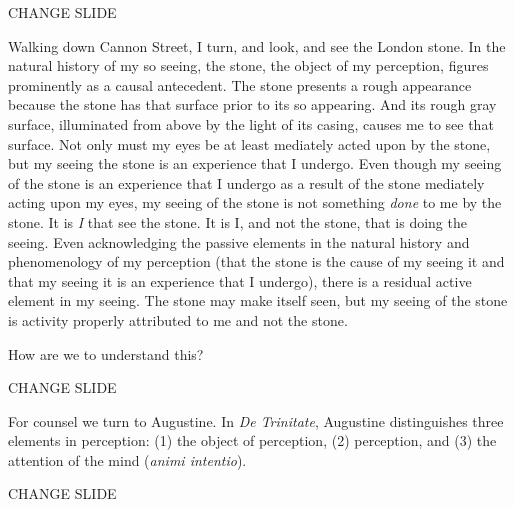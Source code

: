 \documentclass[12pt]{article}
\title{\mytitle}
\author{\myauthor}
\date{} %
\begin{document}
\maketitle

\setlength{\parindent}{1em}


CHANGE SLIDE

Walking down Cannon Street, I turn, and look, and see the London stone. In the natural history of my so seeing, the stone, the object of my perception, figures prominently as a causal antecedent. The stone presents a rough appearance because the stone has that surface prior to its so appearing. And its rough gray surface, illuminated from above by the light of its casing, causes me to see that surface. Not only must my eyes be at least mediately acted upon by the stone, but my seeing the stone is an experience that I undergo. Even though my seeing of the stone is an experience that I undergo as a result of the stone mediately acting upon my eyes, my seeing of the stone is not something \emph{done} to me by the stone. It is \emph{I} that see the stone. It is I, and not the stone, that is doing the seeing. Even acknowledging the passive elements in the natural history and phenomenology of my perception (that the stone is the cause of my seeing it and that my seeing it is an experience that I undergo), there is a residual active element in my seeing. The stone may make itself seen, but my seeing of the stone is activity properly attributed to me and not the stone.

How are we to understand this?

CHANGE SLIDE

For counsel we turn to Augustine. In \emph{De Trinitate}, Augustine distinguishes three elements in perception: (1) the object of perception, (2) perception, and (3) the attention of the mind (\emph{animi intentio}).

CHANGE SLIDE
\end{document}
